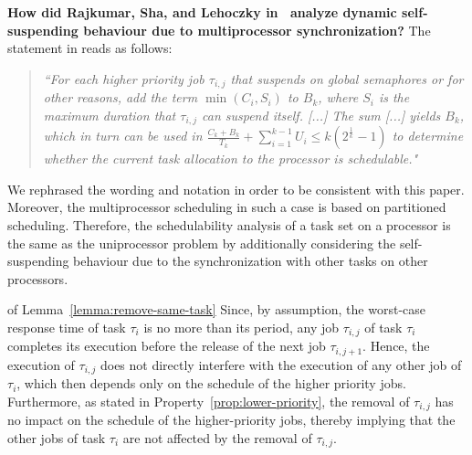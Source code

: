 {\bf How did Rajkumar, Sha, and Lehoczky
  in~\cite[p. 267]{DBLP:conf/rtss/RajkumarSL88} analyze dynamic
  self-suspending behaviour due to multiprocessor synchronization?}
The statement in \cite{DBLP:conf/rtss/RajkumarSL88} reads as follows:
\begin{quote}
\emph{``For each higher priority job $\tau_{i,j}$ that suspends on global semaphores or for other reasons, add the term $\min(C_i, S_i)$ to $B_k$, where $S_i$ is the maximum duration that $\tau_{i,j}$ can suspend itself. [...] The sum [...] yields $B_k$, which in turn can be used in 
$\frac{C_k+B_k}{T_k} + \sum_{i=1}^{k-1} U_i \leq k (2^{\frac{1}{k}}-1)$ to determine whether the current task allocation to the processor is schedulable."}
\end{quote}
  We rephrased the wording and notation in order to be consistent with this paper. Moreover, the multiprocessor scheduling in such a case is based on partitioned scheduling. Therefore, the schedulability analysis of a task set on a processor is the same as the uniprocessor problem by additionally considering the self-suspending behaviour due to the synchronization with other tasks on other processors.

\begin{appProof}{of Lemma~\ref{lemma:remove-same-task}}
Since, by assumption, the worst-case response time of task $\tau_i$ is no more than its period, any job $\tau_{i,j}$ of task $\tau_i$ completes its execution before the release of the next job $\tau_{i,j+1}$. Hence, the execution of $\tau_{i,j}$ does not directly interfere with the execution of any other job of $\tau_i$, which then depends only on the schedule of the higher priority jobs. Furthermore, as stated in Property~\ref{prop:lower-priority}, the removal of $\tau_{i,j}$ has no impact on the schedule of the higher-priority jobs, thereby implying that the other jobs of task $\tau_i$ are not affected by the removal of $\tau_{i,j}$.
\end{appProof}

